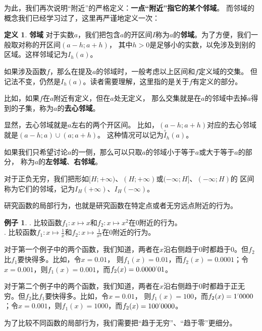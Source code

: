 \documentclass[12pt,UTF8]{ctexbook}
\newcommand{\dlim}[1]{^{\color{gray}\prime}#1}
\theoremstyle{definition}
\newtheorem{df}{定义}[section]
\newtheorem{ex}{例子}[section]
\theoremstyle{plain}
\begin{document}
为此，我们再次说明“附近”的严格定义：\textbf{一点“附近”指它的某个邻域}。
而邻域的概念我们已经学习过了，这里再严谨地定义一次：
\begin{df}{\textbf{邻域}}
    对于实数$a$，我们把包含$a$的开区间$I$称为$a$的\textbf{邻域}。为了方便，我们一般取对称的开区间$(a-h; a+h)$，
    其中$h>0$是足够小的实数，以免涉及到别的区域。这样邻域记为$I_h(a)$。

    如果涉及函数$f$，那么在提及$a$的邻域时，一般考虑以上区间和$f$定义域的交集。
    但记法不变，仍然是$I_h(a)$。读者需要理解，这里指的是关于$f$有定义的部分。

    比如，如果$f$在$a$附近有定义，但在$a$处无定义，
    那么交集就是在$a$的邻域中去掉$a$得到的子集，称为$a$的\textbf{去心邻域}。

    显然，去心邻域就是$a$左右的两个开区间。
    比如，$(a-h; a+h)$对应的去心邻域就是$(a-h; a)\cup(a; a+h)$。
    这种情况可以记为$\overset{\circ}{I}_h(a)$。

    如果我们只希望讨论$a$的一侧，那么可以只取$a$的邻域小于等于$a$或大于等于$a$的部分，
    称为$a$的\textbf{左邻域}、\textbf{右邻域}。

    对于正负无穷，我们把形如$[H; +\infty)$、$(H; +\infty)$或$(-\infty; H]$、$(-\infty; H)$的
    区间称为它们的邻域，记为$I_H(+\infty)$、$I_H(-\infty)$。
\end{df}

研究函数的局部行为，也就是研究函数在特定点或者无穷远点附近的行为。

\begin{ex}
    . 比较函数$f_1: x\mapsto x$和$f_2: x\mapsto x^2$在$0$附近的行为。\\
    . 比较函数$f_1: x\mapsto \frac{1}{x}$和$f_2: x\mapsto \frac{1}{x^2}$在$0$附近的行为。
\end{ex}

对于第一个例子中的两个函数，我们知道，两者在$x$沿右侧趋于$0$时都趋于$0$。但$f_2$比$f_1$要快得多。比如，令$x=0.01$，
则$f_1(x) = 0.01$，而$f_2(x) = 0.0001$；令$x=0.001$，则$f_1(x) = 0.001$，而$f_2(x) = 0.0000\dlim{01}$。

对于第二个例子中的两个函数，我们知道，两者在$x$沿右侧趋于$0$时都趋于正无穷。但$f_2$比$f_1$要快得多。比如，令$x=0.01$，
则$f_1(x) = 100$，而$f_2(x) = 1\dlim{0000}$；令$x=0.001$，则$f_1(x) = 1000$，而$f_2(x) = 100\dlim{0000}$。

为了比较不同函数的局部行为，我们需要把“趋于无穷”、“趋于零”更细分。
\end{document}
